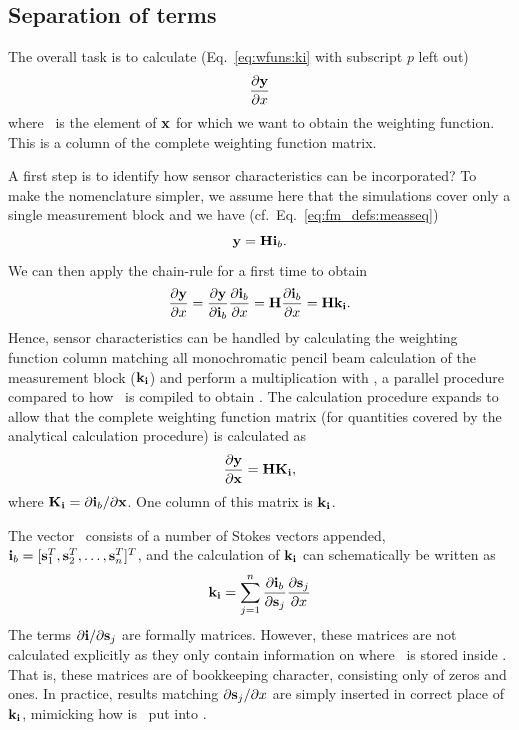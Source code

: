 \subsection{Separation of terms}
\label{sec:wfuns:atmvars:sepe}
%
The overall task is to calculate (Eq.~\ref{eq:wfuns:ki} with subscript $p$ left
out)
\begin{displaymath}
  \frac{\partial\mathbf{y}}{\partial x}  
\end{displaymath}
where \SttElm\ is the element of $\mathbf{x}$ for which we want to obtain the
weighting function. This is a column of the complete weighting function matrix.

A first step is to identify how sensor characteristics can be incorporated? To
make the nomenclature simpler, we assume here that the simulations cover only a
single measurement block and we have (cf.\ Eq.~\ref{eq:fm_defs:measseq})
\begin{equation}
  \mathbf{y} = \mathbf{H}\mathbf{i}_{b}.
  \label{eq:wfuns:Hi}
\end{equation}
We can then apply the chain-rule for a first time to obtain 
\begin{equation}
  \frac{\partial\mathbf{y}}{\partial x} = 
  \frac{\partial\mathbf{y}}{\partial\mathbf{i}_{b}} 
  \frac{\partial\mathbf{i}_{b}}{\partial x} = 
  \mathbf{H} \frac{\partial\mathbf{i}_{b}}{\partial x} = \mathbf{H}\mathbf{k}_{\mathbf{i}}.
  \label{eq:wfuns:Hk}
\end{equation}
Hence, sensor characteristics can be handled by calculating the weighting
function column matching all monochromatic pencil beam calculation of the
measurement block ($\mathbf{k}_{\mathbf{i}}$) and perform a multiplication with
\SnsMtr, a parallel procedure compared to how \ is compiled to obtain
\MsrVct. The calculation procedure expands to allow that the complete
weighting function matrix (for quantities covered by the analytical calculation
procedure) is calculated as
\begin{equation}
  \frac{\partial\mathbf{y}}{\partial\mathbf{x}} = \mathbf{H}\mathbf{K}_{\mathbf{i}},
  \label{eq:wfuns:HK}
\end{equation}
where $\mathbf{K}_{\mathbf{i}} = \partial\mathbf{i}_{b}/\partial\mathbf{x}$. One column of this
matrix is $\mathbf{k}_{\mathbf{i}}$.

The vector \ consists of a number of Stokes vectors appended,
$\mathbf{i}_{b}=[{\bf s}_{1}^T, {\bf s}_{2}^T,\dots,{\bf s}_{n}^T]^T$, and the
calculation of $\mathbf{k}_{\mathbf{i}}$ can schematically be written as
\begin{equation}
  \mathbf{k}_{\mathbf{i}} = \sum_{j=1}^n \frac{\partial\mathbf{i}_{b}}{\partial{\bf s}_{j}}
    \frac{\partial{\bf s}_{j}}{\partial x}
  \label{eq:wfuns:kisum}
\end{equation}
The terms $\partial\mathbf{i}/\partial{\bf s}_{j}$ are formally matrices. However,
these matrices are not calculated explicitly as they only contain information
on where \ is stored inside \MpiVct. That is, these matrices are of
bookkeeping character, consisting only of zeros and ones. In practice, results
matching $\partial{\bf s}_{j}/\partial x$ are simply inserted in correct place
of $\mathbf{k}_{\mathbf{i}}$, mimicking how is \ put into \MpiVct.

